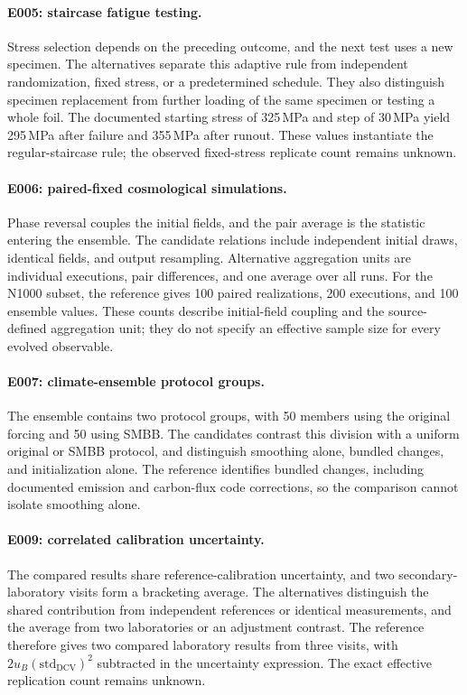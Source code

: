 \paragraph{E005: staircase fatigue testing.}
Stress selection depends on the preceding outcome, and the next test uses a new specimen. The alternatives separate this adaptive rule from independent randomization, fixed stress, or a predetermined schedule. They also distinguish specimen replacement from further loading of the same specimen or testing a whole foil. The documented starting stress of 325\,MPa and step of 30\,MPa yield 295\,MPa after failure and 355\,MPa after runout. These values instantiate the regular-staircase rule; the observed fixed-stress replicate count remains unknown.

\paragraph{E006: paired-fixed cosmological simulations.}
Phase reversal couples the initial fields, and the pair average is the statistic entering the ensemble. The candidate relations include independent initial draws, identical fields, and output resampling. Alternative aggregation units are individual executions, pair differences, and one average over all runs. For the N1000 subset, the reference gives 100 paired realizations, 200 executions, and 100 ensemble values. These counts describe initial-field coupling and the source-defined aggregation unit; they do not specify an effective sample size for every evolved observable.

\paragraph{E007: climate-ensemble protocol groups.}
The ensemble contains two protocol groups, with 50 members using the original forcing and 50 using SMBB. The candidates contrast this division with a uniform original or SMBB protocol, and distinguish smoothing alone, bundled changes, and initialization alone. The reference identifies bundled changes, including documented emission and carbon-flux code corrections, so the comparison cannot isolate smoothing alone.

\paragraph{E009: correlated calibration uncertainty.}
The compared results share reference-calibration uncertainty, and two secondary-laboratory visits form a bracketing average.
The alternatives distinguish the shared contribution from independent references or identical measurements, and the average from two laboratories or an adjustment contrast. The reference therefore gives two compared laboratory results from three visits, with $2u_B(\mathrm{std}_{\mathrm{DCV}})^2$ subtracted in the uncertainty expression. The exact effective replication count remains unknown.

